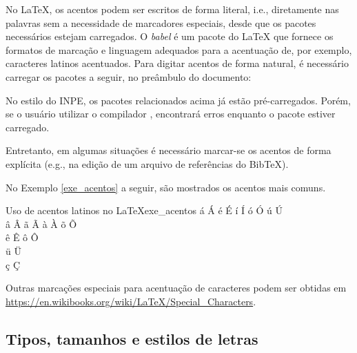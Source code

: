 No \LaTeX{}, os acentos podem ser escritos de forma literal, i.e., diretamente nas palavras sem a necessidade de marcadores especiais, desde que os pacotes necessários estejam carregados. O \textit{babel} é um pacote do \LaTeX{} que fornece os formatos de marcação e linguagem adequados para a acentuação de, por exemplo, caracteres latinos acentuados. Para digitar acentos de forma natural, é necessário carregar os pacotes a seguir, no preâmbulo do documento:

\begin{itemize}
    \item \texttt{\usepackage[brazilian]{babel}}
    \item \texttt{\usepackage[utf8]{inputenc}}
    \item \texttt{\usepackage[T1]{fontenc}}
\end{itemize}

\begin{marker}
  No estilo do INPE, os pacotes relacionados acima já estão pré-carregados. Porém, se o usuário utilizar o compilador \XeLaTeX{}, encontrará erros enquanto o pacote estiver carregado.
\end{marker}

Entretanto, em algumas situações é necessário marcar-se os acentos de forma explícita (e.g., na edição de um arquivo de referências do BibTeX).

No Exemplo \ref{exe_acentos} a seguir, são mostrados os acentos mais comuns.

\begin{texexptitled}[breakable,center lower,enhanced,middle=2mm,listing side text]{Uso de acentos latinos no \LaTeX{}}{exe_acentos}
\'a \'A \'e \'E \'i \'I \'o \'O \'u \'U
\\
\^a \^A \~a \~A \`a \`A \~o \~O
\\
\^e \^E \^o \^O
\\
\"u \"U
\\
\c{c} \c{C}
\end{texexptitled}

\begin{marker}
  Outras marcações especiais para acentuação de caracteres podem ser obtidas em \url{https://en.wikibooks.org/wiki/LaTeX/Special_Characters}.
\end{marker}

\subsection{Tipos, tamanhos e estilos de letras}
\label{sec:marc_text}

